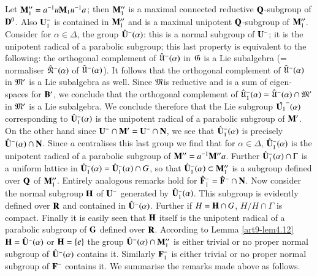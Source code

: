 \subsection{}\label{art9-subsec4.21}
Let $\mathbf{M}''_1 = a^{-1} u \mathbf{M}_1 u^{-1} a$; then $\mathbf{M}''_1$ is a maximal connected reductive $\mathbf{Q}$-subgroup of $\mathbf{D}^0$. Also $\mathbf{U}^-_1$ is contained in $\mathbf{M}''_1$ and is a maximal unipotent $\mathbf{Q}$-subgroup of $\mathbf{M}''_1$. Consider for $\alpha \in \Delta$, the group $\hat{\mathbf{U}}^-(\alpha)$: this is a normal subgroup of $\mathbf{U}^-$; it is the unipotent radical of a parabolic subgroup; this last property is equivalent to the following: the orthogonal complement of $\hat{\mathfrak{U}}^-(\alpha)$ in $\mathfrak{G}$ is a Lie subalgebra (= normaliser $\hat{\mathfrak{N}}^-(\alpha)$ of $\hat{\mathfrak{U}}^- (\alpha)$). It follows that the orthogonal complement of $\hat{\mathfrak{U}}^-(\alpha)$ in $\mathfrak{M}'$ is a Lie subalgebra as well. Since $\mathfrak{M}$\pageoriginale is reductive and is a sum of eigen-spaces for $\mathbf{B}'$, we conclude that the orthogonal complement of $\hat{\mathfrak{U}}^-_1 (\alpha) = \hat{\mathfrak{U}}^-(\alpha) \cap \mathfrak{M}'$ in $\mathfrak{M}'$ is a Lie subalgebra. We conclude therefore that the Lie subgroup $\hat{\mathbf{U}_1}^-(\alpha)$ corresponding to $\hat{\mathbf{U}}^-_1 (\alpha)$ is the unipotent radical of a parabolic subgroup of $\mathbf{M}'$. On the other hand since $\mathbf{U}^- \cap \mathbf{M}' = \mathbf{U}^- \cap \mathbf{N}$, we see that $\hat{\mathbf{U}}^-_1 (\alpha)$ is precisely $\hat{\mathbf{U}}^-(\alpha) \cap \mathbf{N}$. Since $a$ centralises this last group we find that for $\alpha \in\Delta$, $\hat{\mathbf{U}}^-_1 (\alpha)$ is the unipotent radical of a parabolic subgroup of $\mathbf{M}'' = a^{-1} \mathbf{M}'' a$. Further $\hat{\mathbf{U}}^-_1 (\alpha) \cap \Gamma$ is a uniform lattice in $\hat{\mathbf{U}}^-_1 (\alpha) = \hat{\mathbf{U}}^-_1 (\alpha ) \cap G$, so that $\hat{\mathbf{U}}^-_1 (\alpha) \subset \mathbf{M}''_1$ is a subgroup defined over $\mathbf{Q}$ of $\mathbf{M}''_1$. Entirely analogous remarks hold for $\hat{\mathbf{F}}^-_1 = \hat{\mathbf{F}}^- \cap \mathbf{N}$. Now consider the normal subgroup $\mathbf{H}$ of $\mathbf{U}^-$ generated by $\hat{\mathbf{U}}^-_1 (\alpha)$. This subgroup is evidently defined over $\mathbf{R}$ and contained in $\hat{\mathbf{U}}^-(\alpha)$. Further if $H = \mathbf{H} \cap G$,  $H/ H\cap \Gamma$ is compact. Finally it is easily seen that $\mathbf{H}$ itself is the unipotent radical of a  parabolic subgroup of $\mathbf{G}$ defined over $\mathbf{R}$. According to Lemma \ref{art9-lem4.12} $\mathbf{H} = \hat{\mathbf{U}}^-(\alpha)$ or $\mathbf{H} = \{e\}$ \ie the group $\hat{\mathbf{U}}^-(\alpha) \cap \mathbf{M}''_1$ is either trivial or no proper normal subgroup of $\hat{\mathbf{U}}^-(\alpha)$ contains it. Similarly $\mathbf{F}^-_1$ is either trivial or no proper normal subgroup of $\mathbf{F}^-$ contains it. We summarise the remarks made above as follows.

